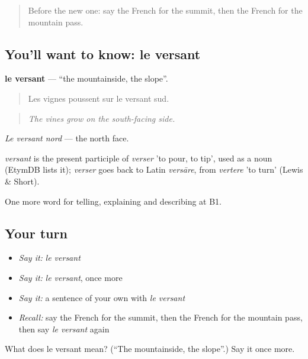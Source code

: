 \label{lesson:FR-C454-versant}



\begin{quote}
Before the new one: say the French for the summit, then the French for the mountain pass.
\end{quote}

\subsection*{You'll want to know: le versant}
\textbf{le versant} — \textquotedblleft{}the mountainside, the slope\textquotedblright{}.

\begin{quote}
Les vignes poussent sur le versant sud.
\end{quote}

\begin{quote}
\emph{The vines grow on the south-facing side.}
\end{quote}

\emph{Le versant nord} — the north face.

\begin{cousinweb}
\emph{versant} is the present participle of \emph{verser} 'to pour, to tip', used as a noun (EtymDB lists it); \emph{verser} goes back to Latin \emph{versāre}, from \emph{vertere} 'to turn' (Lewis \& Short).
\end{cousinweb}

\begin{grammarlens}[title={What you've built}]
One more word for telling, explaining and describing at B1.
\end{grammarlens}

\subsection*{Your turn}
\begin{itemize}
\raggedright
  \item \emph{Say it:} \emph{le versant}
  \item \emph{Say it:} \emph{le versant}, once more
  \item \emph{Say it:} a sentence of your own with \emph{le versant}
  \item \emph{Recall:} say the French for the summit, then the French for the mountain pass, then say \emph{le versant} again
\end{itemize}

\begin{tcolorbox}[breakable,colback=teal!4,colframe=teal!35!black,title={Before you move on}]
What does le versant mean? (\textquotedblleft{}The mountainside, the slope\textquotedblright{}.) Say it once more.
\end{tcolorbox}
